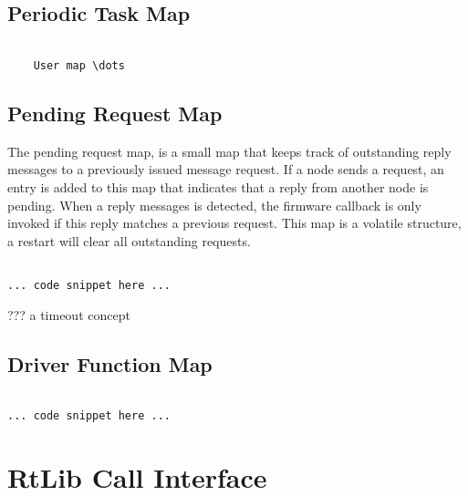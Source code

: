 \subsection{Periodic Task Map}

\lstset{language=c++, style=codesnippetstyle}
\begin{lstlisting}

    User map \dots

\end{lstlisting}
\FloatBarrier

 \subsection{Pending Request Map}

The pending request map, is a small map that keeps track of outstanding reply messages to a previously issued message request. If a node sends a request, an entry is added to this map that indicates that a reply from another node is pending. When a reply messages is detected, the firmware callback is only invoked if this reply matches a previous request. This map is a volatile structure, a restart will clear all outstanding requests.

\lstset{language=c++, style=codesnippetstyle}
\begin{lstlisting}

... code snippet here ...

\end{lstlisting}
\FloatBarrier

??? a timeout concept

\subsection{Driver Function Map}

\lstset{language=c++, style=codesnippetstyle}
\begin{lstlisting}

... code snippet here ...

\end{lstlisting}
\FloatBarrier

\section{RtLib Call Interface}

